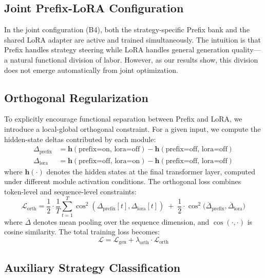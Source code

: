 \documentclass[conference]{IEEEtran}
\begin{document}
\subsection{Joint Prefix-LoRA Configuration}

In the joint configuration (B4), both the strategy-specific Prefix bank and the shared LoRA adapter are active and trained simultaneously. The intuition is that Prefix handles strategy steering while LoRA handles general generation quality---a natural functional division of labor. However, as our results show, this division does not emerge automatically from joint optimization.

\subsection{Orthogonal Regularization}

To explicitly encourage functional separation between Prefix and LoRA, we introduce a local-global orthogonal constraint. For a given input, we compute the hidden-state deltas contributed by each module:
\begin{align}
\Delta_{\text{prefix}} &= \mathbf{h}(\text{prefix=on, lora=off}) - \mathbf{h}(\text{prefix=off, lora=off}) \\
\Delta_{\text{lora}}   &= \mathbf{h}(\text{prefix=off, lora=on})  - \mathbf{h}(\text{prefix=off, lora=off})
\end{align}
where $\mathbf{h}(\cdot)$ denotes the hidden states at the final transformer layer, computed under different module activation conditions. The orthogonal loss combines token-level and sequence-level constraints:
\begin{equation}
\mathcal{L}_{\text{orth}} = \frac{1}{2} \cdot \frac{1}{T}\sum_{t=1}^{T} \cos^2(\Delta_{\text{prefix}}[t], \Delta_{\text{lora}}[t]) \;+\; \frac{1}{2} \cdot \cos^2\!\big(\overline{\Delta}_{\text{prefix}}, \overline{\Delta}_{\text{lora}}\big)
\end{equation}
where $\overline{\Delta}$ denotes mean pooling over the sequence dimension, and $\cos(\cdot, \cdot)$ is cosine similarity. The total training loss becomes:
\begin{equation}
\mathcal{L} = \mathcal{L}_{\text{gen}} + \lambda_{\text{orth}} \cdot \mathcal{L}_{\text{orth}}
\end{equation}

\subsection{Auxiliary Strategy Classification}
\end{document}
